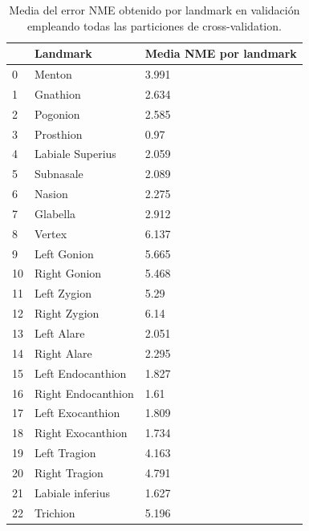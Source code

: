             \begin{table}[!ht]
                \centering
                \caption{Media del error NME obtenido por landmark en validación empleando todas las particiones de cross-validation.}
                \begin{tabular}{|l|l|l|}
                \hline
                    ~ & Landmark & Media NME por landmark \\ \hline
                    0 & Menton & 3.991 \\ \hline
                    1 & Gnathion & 2.634 \\ \hline
                    2 & Pogonion & 2.585 \\ \hline
                    3 & Prosthion & 0.97 \\ \hline
                    4 & Labiale Superius & 2.059 \\ \hline
                    5 & Subnasale & 2.089 \\ \hline
                    6 & Nasion & 2.275 \\ \hline
                    7 & Glabella & 2.912 \\ \hline
                    8 & Vertex & 6.137 \\ \hline
                    9 & Left Gonion & 5.665 \\ \hline
                    10 & Right Gonion & 5.468 \\ \hline
                    11 & Left Zygion & 5.29 \\ \hline
                    12 & Right Zygion & 6.14 \\ \hline
                    13 & Left Alare & 2.051 \\ \hline
                    14 & Right Alare & 2.295 \\ \hline
                    15 & Left Endocanthion & 1.827 \\ \hline
                    16 & Right Endocanthion & 1.61 \\ \hline
                    17 & Left Exocanthion & 1.809 \\ \hline
                    18 & Right Exocanthion & 1.734 \\ \hline
                    19 & Left Tragion & 4.163 \\ \hline
                    20 & Right Tragion & 4.791 \\ \hline
                    21 & Labiale inferius & 1.627 \\ \hline
                    22 & Trichion & 5.196 \\ \hline

\end{tabular}
\end{table}
